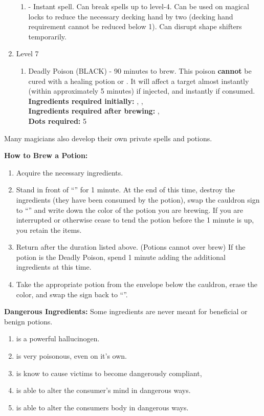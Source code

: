 \documentclass[green]{NeptuneBall}
\begin{document}
\begin{enumerate}
\begin{enumerate}
      \item \aGreaterDispel{} - Instant spell. Can break spells up to level-4. Can be used on magical locks to reduce the necessary decking hand by two (decking hand requirement cannot be reduced below 1). Can disrupt shape shifters temporarily.
    \end{enumerate}
   \item Level 7
    \begin{enumerate}
      \item Deadly Poison (BLACK) - 90 minutes to brew. This poison {\bf cannot} be cured with a healing potion or \aFirstAid{}. It will affect a target almost instantly (within approximately 5 minutes) if injected, and instantly if consumed.\\
      {\bf Ingredients required initially:} \iIceFish{}, \iElectricEel{}, \iSwordfish{}\\
      {\bf Ingredients required after brewing:} \iSnails{}, \iDeepClam{}\\
		  {\bf Dots required:} 5
    \end{enumerate}
\end{enumerate}
Many magicians also develop their own private spells and potions.

{\bf How to Brew a Potion:}\\ %
\begin{enumerate}
  \item Acquire the necessary ingredients.
  \item Stand in front of ``\sEmptyCauldron{}'' for 1 minute. At the end of this time, destroy the ingredients (they have been consumed by the potion), swap the cauldron sign to ``\sFullCauldron{}'' and write down the color of the potion you are brewing. If you are interrupted or otherwise cease to tend the potion before the 1 minute is up, you retain the items.
  \item Return after the duration listed above. (Potions cannot over brew) If the potion is the Deadly Poison, spend 1 minute adding the additional ingredients at this time.
  \item Take the appropriate potion from the envelope below the cauldron, erase the color, and swap the sign back to ``\sEmptyCauldron{}''.
\end{enumerate}


{\bf Dangerous Ingredients:}
Some ingredients are never meant for beneficial or benign potions. 
\begin{enumerate}
\item \iHemlock{} is a powerful hallucinogen.  %
\item \iSnails{} is very poisonous, even on it's own. %
\item \iPearl{} is  know to cause victims to become dangerously compliant, %
\item \iManOfWar{} is able to alter the consumer's mind in dangerous ways. %
\item \iSquid{} is able to alter the consumers body in dangerous ways.  %
\end{enumerate}
\end{document}
